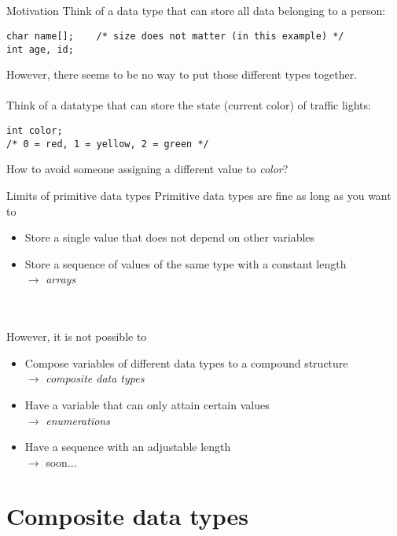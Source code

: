 \subsection{}
\begin{frame}[fragile]{Motivation}
	Think of a data type that can store all data belonging to a person:
	\begin{lstlisting}[numbers=none]
char name[];	/* size does not matter (in this example) */
int age, id;
\end{lstlisting}
	However, there seems to be no way to put those different types together. \\ \ \\
	Think of a datatype that can store the state (current color) of traffic lights:
	\begin{lstlisting}[numbers=none]
int color;
/* 0 = red, 1 = yellow, 2 = green */
\end{lstlisting}
	How to avoid someone assigning a different value to \textit{color}?
\end{frame}
\begin{frame}{Limits of primitive data types}
	Primitive data types are fine as long as you want to
	\begin{itemize}
		\item Store a single value that does not depend on other variables
		\item Store a sequence of values of the same type with a constant length \\
		$\rightarrow$ \textit{arrays}
	\end{itemize} \ \\ \ \\
	However, it is not possible to
	\begin{itemize}
		\item Compose variables of different data types to a compound structure \\
		$\rightarrow$ \textit{composite data types}
		\item Have a variable that can only attain certain values \\
		$\rightarrow$ \textit{enumerations}
		\item Have a sequence with an adjustable length \\
		$\rightarrow$ soon...
	\end{itemize}
\end{frame}

\section{Composite data types}

